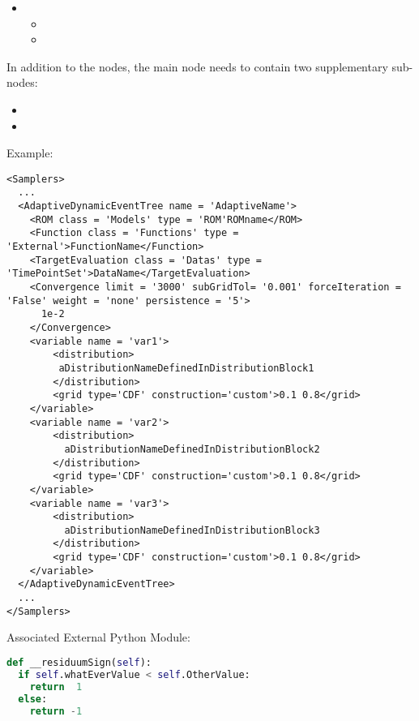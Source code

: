 \begin{itemize}
\item \variableDescription
  \variableChildrenIntro
 \begin{itemize}
    \item \distributionDescription
    \item \gridDescription
  \end{itemize}
\end{itemize}

 In addition to the  nodes, the main
 node needs to contain two supplementary
sub-nodes:

\begin{itemize}
  \item \convergenceDescription
  \item \assemblerDescription
\end{itemize}


Example:
\begin{lstlisting}[style=XML]
<Samplers>
  ...
  <AdaptiveDynamicEventTree name = 'AdaptiveName'>
    <ROM class = 'Models' type = 'ROM'ROMname</ROM>
    <Function class = 'Functions' type = 'External'>FunctionName</Function>
    <TargetEvaluation class = 'Datas' type = 'TimePointSet'>DataName</TargetEvaluation>
    <Convergence limit = '3000' subGridTol= '0.001' forceIteration = 'False' weight = 'none' persistence = '5'>
      1e-2
    </Convergence>
    <variable name = 'var1'>
        <distribution>
         aDistributionNameDefinedInDistributionBlock1
        </distribution> 
        <grid type='CDF' construction='custom'>0.1 0.8</grid>
    </variable>
    <variable name = 'var2'>
        <distribution>
          aDistributionNameDefinedInDistributionBlock2
        </distribution> 
        <grid type='CDF' construction='custom'>0.1 0.8</grid>
    </variable>
    <variable name = 'var3'>
        <distribution>
          aDistributionNameDefinedInDistributionBlock3
        </distribution> 
        <grid type='CDF' construction='custom'>0.1 0.8</grid>
    </variable>
  </AdaptiveDynamicEventTree>
  ...
</Samplers>
\end{lstlisting}

Associated External Python Module:
\begin{lstlisting}[language=python]
def __residuumSign(self):
  if self.whatEverValue < self.OtherValue:
    return  1
  else:
    return -1
\end{lstlisting} 
